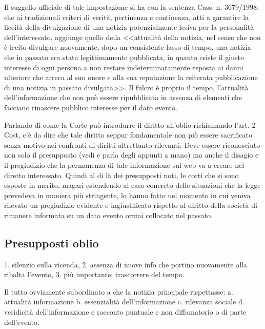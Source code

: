 Il suggello ufficiale di tale impostazione si ha con la sentenza Cass. n. 3679/1998: che ai tradizionali criteri di verità, pertinenza e continenza, atti a garantire la liceità della divulgazione di una notizia potenzialmente lesiva per la personalità dell'interessato, aggiunge quello della <<attualità della notizia, nel senso che non è lecito divulgare nuovamente, dopo un consistente lasso di tempo, una notizia che in passato era stata legittimamente pubblicata, in quanto esiste il giusto interesse di ogni persona a non restare indeterminatamente esposta ai danni ulteriore che arreca al suo onore e alla sua reputazione la reiterata pubblicazione di una notizia in passato divulgata>>.
Il fulcro è proprio il tempo, l'attualità dell'informazione che non può essere ripubblicata in assenza di elementi che facciano rinascere pubblico interesse per il dato evento.

Parlando di come la Corte può introdurre il diritto all'oblio richiamando l'art. 2 Cost, c'è da dire che tale diritto seppur fondamentale non piò essere sacrificato senza motivo nei confronti di diritti altrettanto rilevanti.
Deve essere riconosciuto non solo il presupposto (vedi e parla degli appunti a mano) ma anche il disagio e il pregiudizio che la permanenza di tale informazione sul web va a creare nel diretto interessato.
Quindi al di là dei presupposti noti, le corti che si sono esposte in merito, magari estendendo al caso concreto delle situazioni che la legge prevedeva in maniera più stringente, lo hanno fatto nel momento in cui veniva rilevato un pregiudizio evidente e ingiustificato rispetto al diritto della società di rimanere informata su un dato evento ormai collocato nel passato.

\subsection{Presupposti oblio}
1. silenzio sulla vicenda,
2. assenza di nuove info che portino nuovamente alla ribalta l'evento,
3. più importante: trascorrere del tempo.

Il tutto ovviamente subordinato a che la notizia principale rispettasse:
a. attualità informazione
b. essenzialità dell'informazione
c. rilevanza sociale
d. veridicità dell'informazione e racconto puntuale e non diffamatorio o di parte dell'evento.


